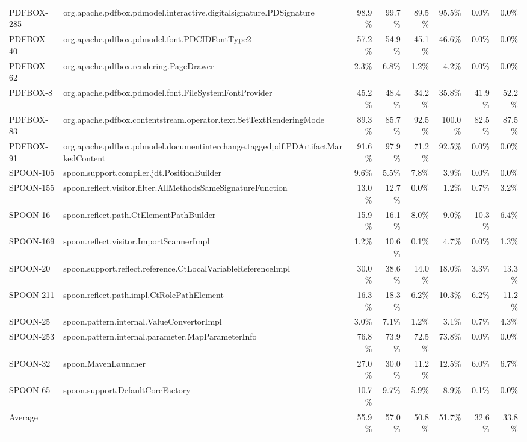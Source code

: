 \begin{tabular}{ ll rr rr rr}
PDFBOX-285  &  org.apache.pdfbox.pdmodel.interactive.digitalsignature.PDSignature & 98.9\% & 99.7\% & 89.5\% & 95.5\% & \cellcolor{light-gray} \textcolor{black}{0.0\%} & \cellcolor{light-gray} \textcolor{black}{0.0\%}\\ 
PDFBOX-40  &  org.apache.pdfbox.pdmodel.font.PDCIDFontType2 & 57.2\% & 54.9\% & 45.1\% & 46.6\% & \cellcolor{light-gray} \textcolor{black}{0.0\%} & \cellcolor{light-gray} \textcolor{black}{0.0\%}\\ 
PDFBOX-62  &  org.apache.pdfbox.rendering.PageDrawer & 2.3\% & 6.8\% & 1.2\% & 4.2\% & \cellcolor{light-gray} \textcolor{black}{0.0\%} & \cellcolor{light-gray} \textcolor{black}{0.0\%}\\ 
PDFBOX-8  &  org.apache.pdfbox.pdmodel.font.FileSystemFontProvider & 45.2\% & 48.4\% & 34.2\% & 35.8\% & 41.9\% & 52.2\%\\ 
PDFBOX-83  &  org.apache.pdfbox.contentstream.operator.text.SetTextRenderingMode & 89.3\% & 85.7\% & 92.5\% & 100.0\% & 82.5\% & 87.5\%\\ 
PDFBOX-91  &  org.apache.pdfbox.pdmodel.documentinterchange.taggedpdf.PDArtifactMarkedContent & 91.6\% & 97.9\% & 71.2\% & 92.5\% & \cellcolor{light-gray} \textcolor{black}{0.0\%} & \cellcolor{light-gray} \textcolor{black}{0.0\%}\\ 
SPOON-105  &  spoon.support.compiler.jdt.PositionBuilder & 9.6\% & 5.5\% & 7.8\% & 3.9\% & \cellcolor{light-gray} \textcolor{black}{0.0\%} & \cellcolor{light-gray} \textcolor{black}{0.0\%}\\ 
SPOON-155  &  spoon.reflect.visitor.filter.AllMethodsSameSignatureFunction & 13.0\% & 12.7\% & \cellcolor{light-gray} \textcolor{black}{0.0\%} & 1.2\% & 0.7\% & 3.2\%\\ 
SPOON-16  &  spoon.reflect.path.CtElementPathBuilder & 15.9\% & 16.1\% & 8.0\% & 9.0\% & 10.3\% & 6.4\%\\ 
SPOON-169  &  spoon.reflect.visitor.ImportScannerImpl & 1.2\% & 10.6\% & 0.1\% & 4.7\% & \cellcolor{light-gray} \textcolor{black}{0.0\%} & 1.3\%\\ 
SPOON-20  &  spoon.support.reflect.reference.CtLocalVariableReferenceImpl & 30.0\% & 38.6\% & 14.0\% & 18.0\% & 3.3\% & 13.3\%\\ 
SPOON-211  &  spoon.reflect.path.impl.CtRolePathElement & 16.3\% & 18.3\% & 6.2\% & 10.3\% & 6.2\% & 11.2\%\\ 
SPOON-25  &  spoon.pattern.internal.ValueConvertorImpl & 3.0\% & 7.1\% & 1.2\% & 3.1\% & 0.7\% & 4.3\%\\ 
SPOON-253  &  spoon.pattern.internal.parameter.MapParameterInfo & 76.8\% & 73.9\% & 72.5\% & 73.8\% & \cellcolor{light-gray} \textcolor{black}{0.0\%} & \cellcolor{light-gray} \textcolor{black}{0.0\%}\\ 
SPOON-32  &  spoon.MavenLauncher & 27.0\% & 30.0\% & 11.2\% & 12.5\% & 6.0\% & 6.7\%\\ 
SPOON-65  &  spoon.support.DefaultCoreFactory & 10.7\% & 9.7\% & 5.9\% & 8.9\% & 0.1\% & \cellcolor{light-gray} \textcolor{black}{0.0\%}\\ 
\midrule 
Average &  &  55.9\% &  57.0\% &  50.8\% &  51.7\% &  32.6\% &  33.8\%\\ 
\bottomrule 
\end{tabular} 
